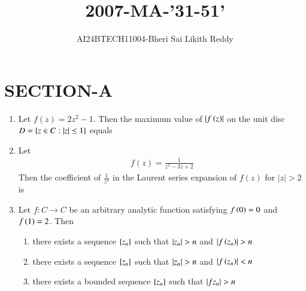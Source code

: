 \documentclass[journal]{IEEEtran}
\begin{document}

\onecolumn
\newpage
\title{2007-MA-'31-51'}
\author{AI24BTECH11004-Bheri Sai Likith Reddy}
\maketitle
\section{SECTION-A}
\begin{enumerate}
	\item Let $f(z)=2 z^{2}-1$. Then the maximum value of $\left\vert f\left(z\right)\right\vert$ on the unit disc $D=\left\{z \in C:\left\vert z\right\vert \leq 1\right\}$ equals
	       \begin{enumerate}
        	\end{enumerate}	
	\item Let 
             \begin{align*}  
		f(z)=\frac{1}{z^{2}-3 z+2}
              \end{align*}
	         Then the coefficient of $\frac{1}{z^{3}}$ in the Laurent series expansion of $f(z)$ for $|z|>2$ is
               \begin{enumerate}
			        \begin{multicols}{4}  
		       \item $1$
		       \item $2$
		       \item $3$
		       \item $4$
                    \end{multicols}   
	       \end{enumerate}	
       \item Let $f: C \rightarrow C$ be an arbitrary analytic function satisfying $f\left(0\right)=0$ and $f\left(1\right)=2$. Then
		\begin{enumerate}
			\item there exists a sequence $\left\{z_{n}\right\}$ such that $\left\vert z_{n}\right\vert>n$ and $\left\vert f\left(z_{n}\right)\right\vert>n$
			\item there exists a sequence $\left\{z_{n}\right\}$ such that $\left\vert z_{n}\right\vert>n$ and $\left\vert f\left(z_{n}\right)\right\vert<n$
			\item there exists a bounded sequence $\left\{z_{n}\right\}$ such that $\left\vert f{z_{n}}\right\vert>n$

\end{enumerate}
\end{enumerate}
\end{document}
